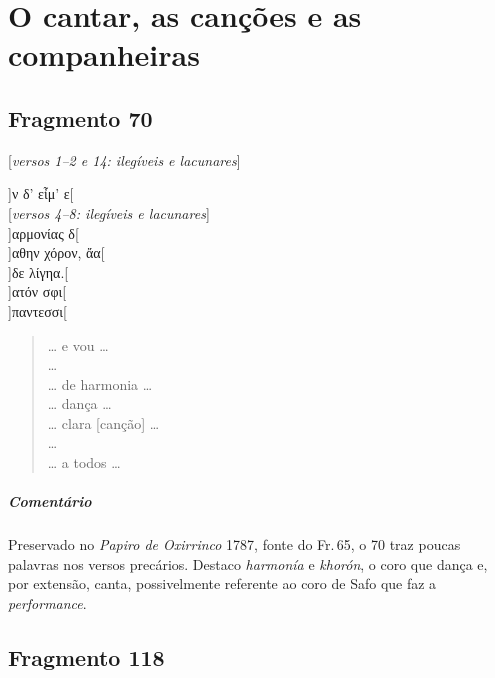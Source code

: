 \chapter[O cantar, as canções e as companheiras]{O cantar, as canções e as companheiras}

\section{Fragmento 70}

\begin{gkverse}
\textnormal{[\emph{versos 1--2 e 14: ilegíveis e lacunares}]}

]ν δ’ εἶμ’ ε[\\

\textnormal{[\emph{versos 4--8: ilegíveis e lacunares}]}\\

]αρμονίας δ[\\
         ]αθην χόρον, ἄα[\\
   ]δε λίγηα.[\\
   ]ατόν σφι[\\
  ]παντεσσι[

\end{gkverse}

\begin{verse}
\ldots{} e vou \ldots{}\\
\ldots{}\\
\ldots{} de harmonia \ldots{}\\
\ldots{} dança \ldots{}\\
\ldots{} clara [canção] \ldots{}\\
\ldots{}\\
\ldots{} a todos \ldots{} 
\end{verse}


{\paragraph{Comentário} Preservado no \emph{Papiro de Oxirrinco} 1787, fonte do Fr.\,65, o 70 traz poucas palavras nos versos precários. Destaco \emph{harmonía} e \emph{khorón}, o coro que dança e, por extensão, canta, possivelmente referente ao coro de Safo que faz a \emph{performance}.}

\section{Fragmento 118}

